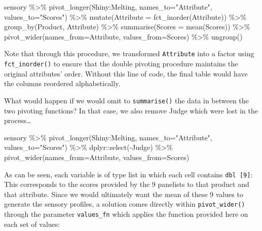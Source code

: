 \documentclass[
]{book}
\newenvironment{Shaded}{\begin{snugshade}}{\end{snugshade}}
\newcommand{\AttributeTok}[1]{\textcolor[rgb]{0.77,0.63,0.00}{#1}}
\newcommand{\FunctionTok}[1]{\textcolor[rgb]{0.00,0.00,0.00}{#1}}
\newcommand{\NormalTok}[1]{#1}
\newcommand{\SpecialCharTok}[1]{\textcolor[rgb]{0.00,0.00,0.00}{#1}}
\newcommand{\StringTok}[1]{\textcolor[rgb]{0.31,0.60,0.02}{#1}}
\begin{document}
\begin{Shaded}
\begin{Highlighting}[]
\NormalTok{sensory }\SpecialCharTok{\%\textgreater{}\%} 
  \FunctionTok{pivot\_longer}\NormalTok{(Shiny}\SpecialCharTok{:}\NormalTok{Melting, }\AttributeTok{names\_to=}\StringTok{"Attribute"}\NormalTok{, }\AttributeTok{values\_to=}\StringTok{"Scores"}\NormalTok{) }\SpecialCharTok{\%\textgreater{}\%} 
  \FunctionTok{mutate}\NormalTok{(}\AttributeTok{Attribute =} \FunctionTok{fct\_inorder}\NormalTok{(Attribute)) }\SpecialCharTok{\%\textgreater{}\%} 
  \FunctionTok{group\_by}\NormalTok{(Product, Attribute) }\SpecialCharTok{\%\textgreater{}\%} 
  \FunctionTok{summarise}\NormalTok{(}\AttributeTok{Scores =} \FunctionTok{mean}\NormalTok{(Scores)) }\SpecialCharTok{\%\textgreater{}\%} 
  \FunctionTok{pivot\_wider}\NormalTok{(}\AttributeTok{names\_from=}\NormalTok{Attribute, }\AttributeTok{values\_from=}\NormalTok{Scores) }\SpecialCharTok{\%\textgreater{}\%} 
  \FunctionTok{ungroup}\NormalTok{()}
\end{Highlighting}
\end{Shaded}

Note that through this procedure, we transformed \texttt{Attribute} into a factor using \texttt{fct\_inorder()} to ensure that the double pivoting procedure maintains the original attributes' order. Without this line of code, the final table would have the columns reordered alphabetically.

What would happen if we would omit to \texttt{summarise()} the data in between the two pivoting functions? In that case, we also remove Judge which were lost in the process\ldots{}

\begin{Shaded}
\begin{Highlighting}[]
\NormalTok{sensory }\SpecialCharTok{\%\textgreater{}\%} 
  \FunctionTok{pivot\_longer}\NormalTok{(Shiny}\SpecialCharTok{:}\NormalTok{Melting, }\AttributeTok{names\_to=}\StringTok{"Attribute"}\NormalTok{, }\AttributeTok{values\_to=}\StringTok{"Scores"}\NormalTok{) }\SpecialCharTok{\%\textgreater{}\%} 
\NormalTok{  dplyr}\SpecialCharTok{::}\FunctionTok{select}\NormalTok{(}\SpecialCharTok{{-}}\NormalTok{Judge) }\SpecialCharTok{\%\textgreater{}\%} 
  \FunctionTok{pivot\_wider}\NormalTok{(}\AttributeTok{names\_from=}\NormalTok{Attribute, }\AttributeTok{values\_from=}\NormalTok{Scores)}
\end{Highlighting}
\end{Shaded}

As can be seen, each variable is of type list in which each cell contains \texttt{dbl\ {[}9{]}}: This corresponds to the scores provided by the 9 panelists to that product and that attribute. Since we would ultimately want the mean of these 9 values to generate the sensory profiles, a solution comes directly within \texttt{pivot\_wider()} through the parameter \texttt{values\_fn} which applies the function provided here on each set of values:
\end{document}
